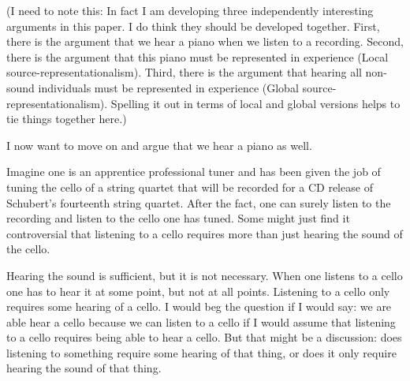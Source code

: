 \documentclass[sloppy, journal, git, bytitle, dodraft]{humapap}
\begin{document}


(I need to note this: In fact I am developing three independently interesting arguments in this paper. I do think they should be developed together. First, there is the argument that we hear a piano when we listen to a recording. Second, there is the argument that this piano must be represented in experience (Local source-representationalism). Third, there is the argument that hearing all non-sound individuals must be represented in experience (Global source-representationalism). Spelling it out in terms of local and global versions helps to tie things together here.)

\sect I now want to move on and argue that we hear a piano as well. 

Imagine one is an apprentice professional tuner and has been given the job of tuning the cello of a string quartet that will be recorded for a CD release of Schubert's fourteenth string quartet. After the fact, one can surely listen to the recording and listen to the cello one has tuned. Some might just find it controversial that listening to a cello requires more than just hearing the sound of the cello.

Hearing the sound is sufficient, but it is not necessary. When one listens to a cello one has to hear it at some point, but not at all points. Listening to a cello only requires some hearing of a cello. I would beg the question if I would say: we are able hear a cello because we can listen to a cello if I would assume that listening to a cello requires being able to hear a cello. But that might be a discussion: does listening to something require some hearing of that thing, or does it only require hearing the sound of that thing. 
\end{document}
